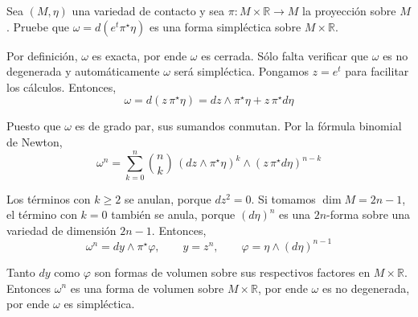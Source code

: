 \begin{problem}
Sea $(M, \eta)$ una variedad de contacto y sea $\pi : M \times \mathbb R \to M$ la proyección sobre $M$. Pruebe que $\omega = d(e^t \pi^\star \eta)$ es una forma simpléctica sobre $M \times \mathbb R$.
\end{problem}

\begin{solution}
Por definición, $\omega$ es exacta, por ende $\omega$ es cerrada. Sólo falta verificar que $\omega$ es no degenerada y automáticamente $\omega$ será simpléctica. Pongamos $z = e^t$ para facilitar los cálculos. Entonces,
$$\omega = d(z \, \pi^\star \eta) = dz \wedge \pi^\star \eta + z \, \pi^\star d\eta$$

Puesto que $\omega$ es de grado par, sus sumandos conmutan. Por la fórmula binomial de Newton,
$$\omega^n = \sum_{k=0}^n \binom nk \, (dz \wedge \pi^\star \eta)^k \wedge (z \, \pi^\star d\eta)^{n-k}$$

Los términos con $k \ge 2$ se anulan, porque $dz^2 = 0$. Si tomamos $\dim M = 2n-1$, el término con $k = 0$ también se anula, porque $(d\eta)^n$ es una $2n$-forma sobre una variedad de dimensión $2n-1$. Entonces,
$$\omega^n = dy \wedge \pi^\star \varphi, \qquad y = z^n, \qquad \varphi = \eta \wedge (d\eta)^{n-1}$$

Tanto $dy$ como $\varphi$ son formas de volumen sobre sus respectivos factores en $M \times \mathbb R$. Entonces $\omega^n$ es una forma de volumen sobre $M \times \mathbb R$, por ende $\omega$ es no degenerada, por ende $\omega$ es simpléctica.
\end{solution}
